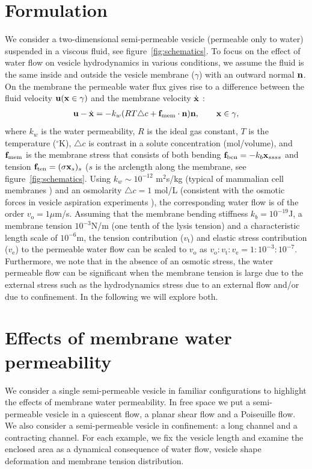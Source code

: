 \documentclass[9pt,twocolumn,twoside,lineno]{pnas-new}
\begin{document}
\section*{Formulation}
We consider a two-dimensional semi-permeable vesicle (permeable only to water) suspended in a viscous fluid, see figure~\ref{fig:schematics}.
To focus on the effect of water flow on vesicle hydrodynamics in various conditions, we assume the fluid is the same inside and outside the vesicle membrane ($\gamma$) with an outward normal $\mathbf{n}$.
On the membrane the permeable water flux gives rise to a difference between the fluid velocity ${\bf u}({\bf x}\in \gamma)$
and the membrane velocity $\dot{\bf x}$ \cite{yao-mor2017}:
\begin{align}
  \label{eqn:vesicleFlux}
  \mathbf{u} - \dot{\mathbf{x}} = - k_w (R T \triangle c + \mathbf{f}_\mathrm{mem} \cdot \mathbf{n}) \mathbf{n}, \qquad
  \mathbf{x} \in \gamma,
\end{align}
where $k_w$ is the water permeability, $R$ is the ideal gas constant, $T$ is the temperature ($^{\circ}$K), $\triangle c$ is contrast in a solute concentration (mol/volume),
and $\mathbf{f}_\mathrm{mem}$ is the membrane stress that consists of both bending $ \mathbf{f}_\mathrm{ben}= -k_b \mathbf{x}_{ssss}$ and tension $\mathbf{f}_\mathrm{ten}=(\sigma \mathbf{x}_s)_s$ ($s$
is the arclength along the membrane, see figure~\ref{fig:schematics}. Using $k_w\sim 10^{-12}$ m$^2$s/kg (typical of mammalian cell membranes \cite{LiMoriSun2015_PRL}) and an osmolarity $\triangle c = 1$ mol/L (consistent with the osmotic forces in vesicle aspiration experiments \cite{OlbrichRawiczNeedhamEtAl2000_BJ}), the corresponding water flow is of the order $v_\mathrm{o}=1 \mu$m/s. Assuming that the membrane bending stiffness $k_b = 10^{-19}$J, a membrane tension $10^{-3}$N/m (one tenth of the lysis tension) and a characteristic length scale of $10^{-6}$m, the tension contribution ($v_\mathrm{t}$) and elastic stress contribution 
($v_\mathrm{e}$) to the permeable water flow can be scaled to $v_\mathrm{o}$ as $v_\mathrm{o}:v_\mathrm{t}:v_\mathrm{e}=1:10^{-3}:10^{-7}$.  Furthermore, we note that in the absence of an osmotic stress, the water permeable flow can be significant when the membrane tension is large due to the external stress such as the hydrodynamics stress due to an external flow and/or due to confinement.
In the following we will explore both.


\section*{Effects of membrane water permeability}
We consider a single semi-permeable vesicle in familiar configurations to highlight the effects of membrane water permeability.
In free space we put a semi-permeable vesicle in a quiescent flow, a planar shear flow and a Poiseuille flow.
We also consider a semi-permeable vesicle in confinement: a long channel and a contracting channel.
For each example, we fix the vesicle length and examine the enclosed area as a dynamical consequence of water flow, vesicle shape deformation and membrane tension distribution.
\end{document}

